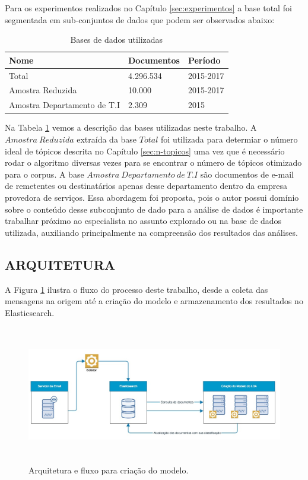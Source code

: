 \documentclass[12pt,a4paper]{article}
\begin{document}
Para os experimentos realizados no Capítulo \ref{sec:experimentos} a base total foi segmentada em sub-conjuntos de dados que podem ser observados abaixo:

\begin{table}[H]
  \centering
  \begin{tabular}{l l l}
  Nome  		              & Documentos & Período\\
  \hline
  Total                           & 4.296.534 & 2015-2017 \\
  Amostra Reduzida	              & 10.000    & 2015-2017 \\
  Amostra Departamento de T.I		  & 2.309     & 2015      \\
  \hline
  \end{tabular}
  \caption{Bases de dados utilizadas}
  \label{tab-base-de-dados}
\end{table}

Na Tabela \ref{tab-base-de-dados} vemos a descrição das bases utilizadas neste trabalho. A $Amostra\ Reduzida$ extraída da base $Total$ foi utilizada para determiar o número ideal de tópicos
 descrita no Capítulo \ref{sec:n-topicos} uma vez que é necessário rodar o algoritmo diversas vezes para se encontrar o número de tópicos otimizado para 
 o corpus. A base $Amostra\ Departamento\ de\ T.I$ são documentos de e-mail de remetentes ou destinatários apenas desse departamento dentro da empresa provedora
 de serviços. Essa abordagem foi proposta, pois o autor possui domínio sobre o conteúdo desse subconjunto de dado para a análise de dados é importante trabalhar próximo ao especialista
 no assunto explorado ou na base de dados utilizada, auxiliando principalmente na compreensão dos resultados das análises.

 \subsection{ARQUITETURA} \label{sec:arquitetura}

 A Figura \ref{fig-framework-lda} ilustra o fluxo do processo deste trabalho, desde a coleta das mensagens na origem até a criação do modelo e armazenamento dos resultados no Elasticsearch.

\begin{figure}[H]
	\centering
  \includegraphics[height=6cm]{images/figure_11.jpg}
  \caption{Arquitetura e fluxo para criação do modelo.}
  \label{fig-framework-lda}
\end{figure}
\end{document}
